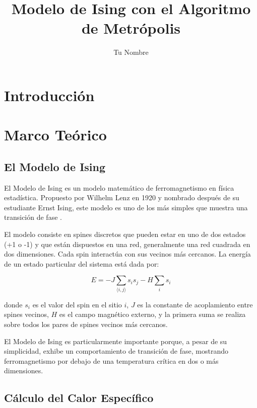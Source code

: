 \documentclass[twocolumn]{article}
\title{Modelo de Ising con el Algoritmo de Metrópolis}
\author{Tu Nombre}
\date{}
\begin{document}
\maketitle

\begin{abstract}
\end{abstract}

\section{Introducción}

\section{Marco Teórico}
\subsection*{El Modelo de Ising}

El Modelo de Ising es un modelo matemático de ferromagnetismo en física estadística. Propuesto por Wilhelm Lenz en 1920 y nombrado después de su estudiante Ernst Ising, este modelo es uno de los más simples que muestra una transición de fase \cite{isingwiki}.

El modelo consiste en spines discretos que pueden estar en uno de dos estados (+1 o -1) y que están dispuestos en una red, generalmente una red cuadrada en dos dimensiones. Cada spin interactúa con sus vecinos más cercanos. La energía de un estado particular del sistema está dada por:

\begin{equation}
    E = -J \sum_{\langle i,j \rangle} s_i s_j - H \sum_i s_i
\end{equation}

donde $s_i$ es el valor del spin en el sitio $i$, $J$ es la constante de acoplamiento entre spines vecinos, $H$ es el campo magnético externo, y la primera suma se realiza sobre todos los pares de spines vecinos más cercanos.

El Modelo de Ising es particularmente importante porque, a pesar de su simplicidad, exhibe un comportamiento de transición de fase, mostrando ferromagnetismo por debajo de una temperatura crítica en dos o más dimensiones.

\subsection*{Cálculo del Calor Específico}
\end{document}
